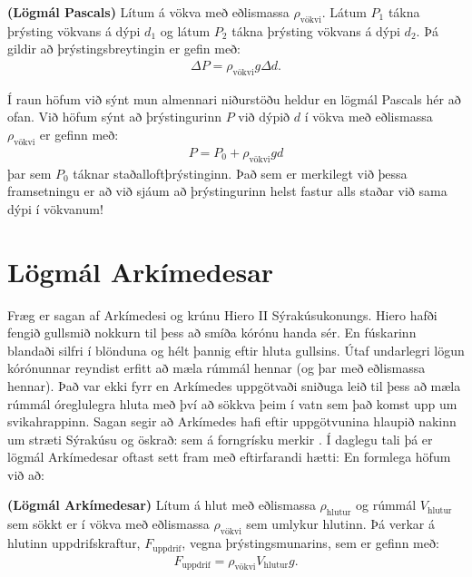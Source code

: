 \begin{tcolorbox}
\begin{theorem}
\textbf{(Lögmál Pascals)} Lítum á vökva með eðlismassa $\rho_{\text{vökvi}}$. Látum $P_1$ tákna þrýsting vökvans á dýpi $d_1$ og látum $P_2$ tákna þrýsting vökvans á dýpi $d_2$. Þá gildir að þrýstingsbreytingin er gefin með:
\begin{align*}
    \Delta P = \rho_{\text{vökvi}}g\Delta d.
\end{align*}
\end{theorem}
\end{tcolorbox}

Í raun höfum við sýnt mun almennari niðurstöðu heldur en lögmál Pascals hér að ofan. Við höfum sýnt að þrýstingurinn $P$ við dýpið $d$ í vökva með eðlismassa $\rho_{\text{vökvi}}$ er gefinn með:
\begin{align*}
    P = P_0 + \rho_{\text{vökvi}} g d
\end{align*}
þar sem $P_0$ táknar staðalloftþrýstinginn. Það sem er merkilegt við þessa framsetningu er að við sjáum að þrýstingurinn helst fastur alls staðar við sama dýpi í vökvanum!

\section{Lögmál Arkímedesar}



Fræg er sagan af Arkímedesi og krúnu Hiero II Sýrakúsukonungs. Hiero hafði fengið gullsmið nokkurn til þess að smíða kórónu handa sér. En fúskarinn blandaði silfri í blönduna og hélt þannig eftir hluta gullsins. Útaf undarlegri lögun kórónunnar reyndist erfitt að mæla rúmmál hennar (og þar með eðlismassa hennar). Það var ekki fyrr en Arkímedes uppgötvaði sniðuga leið til þess að mæla rúmmál óreglulegra hluta með því að sökkva þeim í vatn sem það komst upp um svikahrappinn. Sagan segir að Arkímedes hafi eftir uppgötvunina hlaupið nakinn um stræti Sýrakúsu og öskrað:  sem á forngrísku merkir . Í daglegu tali þá er lögmál Arkímedesar oftast sett fram með eftirfarandi hætti:  En formlega höfum við að:

\begin{tcolorbox}
\begin{theorem}
\textbf{(Lögmál Arkímedesar)} Lítum á hlut með eðlismassa $\rho_{\text{hlutur}}$ og rúmmál $V_{\text{hlutur}}$ sem sökkt er í vökva með eðlismassa $\rho_{\text{vökvi}}$ sem umlykur hlutinn. Þá verkar á hlutinn uppdrifskraftur, $F_{\text{uppdrif}}$, vegna þrýstingsmunarins, sem er gefinn með:
\begin{align*}
    F_{\text{uppdrif}} = \rho_{\text{vökvi}}V_{\text{hlutur}}g.
\end{align*}
\end{theorem}
\end{tcolorbox}

